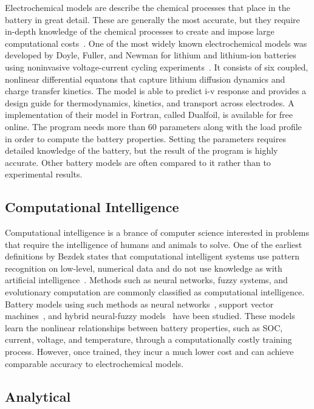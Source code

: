 \documentclass[../zhang_thesis.tex]{subfiles}
\begin{document}
Electrochemical models are describe the chemical processes that place in the battery in great detail. These are generally the most accurate, but they require in-depth knowledge of the chemical processes to create and impose large computational costs~\cite{jongerden09}. One of the most widely known electrochemical models was developed by Doyle, Fuller, and Newman for lithium and lithium-ion batteries using noninvasive voltage-current cycling
experiments~\cite{doyle93,fuller94,fuller94b}. It consists of six coupled, nonlinear differential equatons that capture lithium diffusion dynamics and charge transfer kinetics. The model is able to predict i-v response and provides a design guide for thermodynamics, kinetics, and transport across electrodes. A implementation of their model in Fortran, called Dualfoil, is available for free online. The program needs more than 60 parameters along with the load profile
in order to compute the battery properties. Setting the parameters requires detailed knowledge of the battery, but the result of the program is highly accurate. Other battery models are often compared to it rather than to experimental results.

\subsection{Computational Intelligence}

Computational intelligence is a brance of computer science interested in problems that require the intelligence of humans and animals to solve. One of the earliest definitions by Bezdek states that computational intelligent systems use pattern recognition on low-level, numerical data and do not use knowledge as with artificial intelligence~\cite{bezdek92,bezdek94}. Methods such as neural networks, fuzzy systems, and evolutionary computation are commonly classified as computational
intelligence. Battery models using such methods as neural networks~\cite{ogorman98,capizzi11}, support vector machines~\cite{wang06}, and hybrid neural-fuzzy models~\cite{shen02} have been studied. These models learn the nonlinear relationships between battery properties, such as SOC, current, voltage, and temperature, through a computationally costly training process. However, once trained, they incur a much lower cost and can achieve comparable accuracy to electrochemical
models.

\subsection{Analytical}
\end{document}
